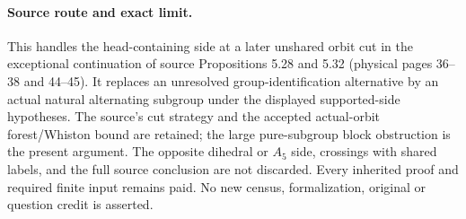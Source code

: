 \documentclass[11pt,a4paper]{article}
\begin{document}
\paragraph{Source route and exact limit.}
This handles the head-containing side at a later unshared orbit
cut in the exceptional continuation of source Propositions
5.28 and 5.32 (physical pages 36--38 and 44--45).
It replaces an unresolved group-identification alternative
by an actual natural alternating subgroup under the displayed
supported-side hypotheses. The source's cut strategy and the
accepted actual-orbit forest/Whiston bound are retained; the
large pure-subgroup block obstruction is the present argument.
The opposite dihedral or $A_5$ side, crossings with shared labels,
and the full source conclusion are not discarded. Every inherited
proof and required finite input remains paid. No new census,
formalization, original or question credit is asserted.
\end{document}
